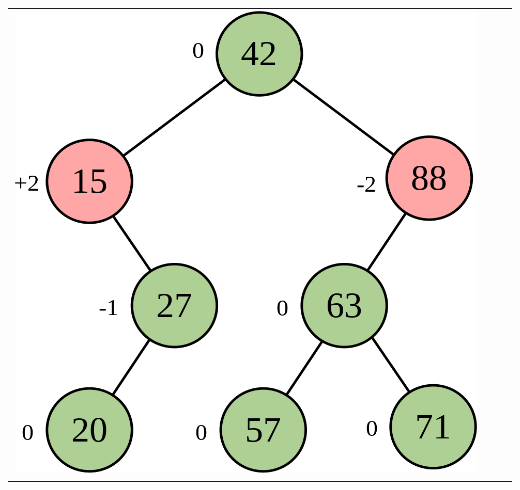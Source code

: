 \documentclass[aspectratio=169]{beamer}
\begin{document}
\begin{frame}[fragile]
\begin{tabular}{lll}
\includegraphics[height=0.4\paperheight]{imagens/avl10c.png} \\
\end{tabular}
\end{frame}
\end{document}
